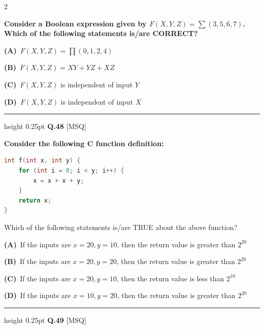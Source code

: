 \documentclass[a4paper,10pt,twoside]{article}
\begin{document}
\begin{multicols}{2}
{\bfseries Consider a Boolean expression given by $F(X, Y, Z) = \sum(3, 5, 6, 7)$. Which of the following statements is/are CORRECT? \par}
\par\vspace{2pt}\noindent
\textbf{(A)}~$F(X, Y, Z) = \prod(0, 1, 2, 4)$\par\vspace{2pt}\noindent
\textbf{(B)}~$F(X, Y, Z) = XY + YZ + XZ$\par\vspace{2pt}\noindent
\textbf{(C)}~$F(X, Y, Z)$ is independent of input $Y$\par\vspace{2pt}\noindent
\textbf{(D)}~$F(X, Y, Z)$ is independent of input $X$
\par\vspace{6pt}\hrule height 0.25pt\vspace{6pt}
\noindent\textbf{Q.48} \hfill {\footnotesize\textsf{[MSQ]}}
\par\vspace{2pt}
{\bfseries Consider the following C function definition:
\begin{lstlisting}[language=C]
int f(int x, int y) {
    for (int i = 0; i < y; i++) {
        x = x + x + y;
    }
    return x;
}
\end{lstlisting}
Which of the following statements is/are TRUE about the above function? \par}
\par\vspace{2pt}\noindent
\textbf{(A)}~If the inputs are $x=20, y=10$, then the return value is greater than $2^{20}$\par\vspace{2pt}\noindent
\textbf{(B)}~If the inputs are $x=20, y=20$, then the return value is greater than $2^{20}$\par\vspace{2pt}\noindent
\textbf{(C)}~If the inputs are $x=20, y=10$, then the return value is less than $2^{10}$\par\vspace{2pt}\noindent
\textbf{(D)}~If the inputs are $x=10, y=20$, then the return value is greater than $2^{20}$
\par\vspace{6pt}\hrule height 0.25pt\vspace{6pt}
\noindent\textbf{Q.49} \hfill {\footnotesize\textsf{[MSQ]}}
\par\vspace{2pt}

\end{multicols}
\end{document}
